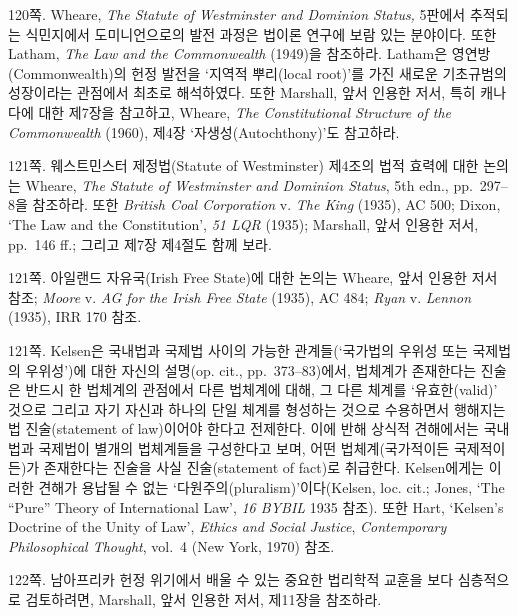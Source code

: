 {\noteentry 120쪽.  Wheare,
\emph{The Statute of Westminster and Dominion Status,} 5판에서 추적되는
식민지에서 도미니언으로의 발전 과정은 법이론 연구에 보람 있는 분야이다.
또한 Latham, \emph{The Law and the Commonwealth} (1949)을 참조하라.
Latham은 영연방(Commonwealth)의 헌정 발전을 ‘지역적 뿌리(local root)’를
가진 새로운 기초규범의 성장이라는 관점에서 최초로 해석하였다. 또한
Marshall, 앞서 인용한 저서, 특히 캐나다에 대한 제7장을 참고하고, Wheare,
\emph{The Constitutional Structure of the Commonwealth} (1960), 제4장
‘자생성(Autochthony)’도 참고하라.

\noteentry 121쪽.  웨스트민스터 제정법(Statute of Westminster) 제4조의 법적 효력에 대한
논의는 Wheare, \emph{The Statute of Westminster and Dominion Status},
5th edn., pp.~297--8을 참조하라. 또한 \emph{British Coal Corporation} v.
\emph{The King} (1935), AC 500; Dixon, `The Law and the Constitution',
\emph{51 LQR} (1935); Marshall, 앞서 인용한 저서, pp.~146 ff.; 그리고
제7장 제4절도 함께 보라.

\noteentry 121쪽.  아일랜드 자유국(Irish Free State)에
대한 논의는 Wheare, 앞서 인용한 저서 참조; \emph{Moore} v. \emph{AG for
the Irish Free State} (1935), AC 484; \emph{Ryan} v. \emph{Lennon}
(1935), IRR 170 참조.

\noteentry 121쪽.  Kelsen은 국내법과 국제법 사이의 가능한 관계들(‘국가법의 우위성
또는 국제법의 우위성’)에 대한 자신의 설명(op. cit., pp.~373--83)에서,
법체계가 존재한다는 진술은 반드시 한 법체계의 관점에서 다른 법체계에
대해, 그 다른 체계를 ‘유효한(valid)’ 것으로 그리고 자기 자신과 하나의
단일 체계를 형성하는 것으로 수용하면서 행해지는 법 진술(statement of
law)이어야 한다고 전제한다. 이에 반해 상식적 견해에서는 국내법과
국제법이 별개의 법체계들을 구성한다고 보며, 어떤 법체계(국가적이든
국제적이든)가 존재한다는 진술을 사실 진술(statement of fact)로 취급한다.
Kelsen에게는 이러한 견해가 용납될 수 없는
‘다원주의(pluralism)’이다(Kelsen, loc. cit.; Jones, `The “Pure” Theory
of International Law', \emph{16 BYBIL} 1935 참조). 또한 Hart, `Kelsen's
Doctrine of the Unity of Law', \emph{Ethics and Social Justice},
\emph{Contemporary Philosophical Thought}, vol.~4 (New York, 1970) 참조.

\noteentry 122쪽.  남아프리카 헌정 위기에서 배울 수
있는 중요한 법리학적 교훈을 보다 심층적으로 검토하려면, Marshall, 앞서
인용한 저서, 제11장을 참조하라.

}
